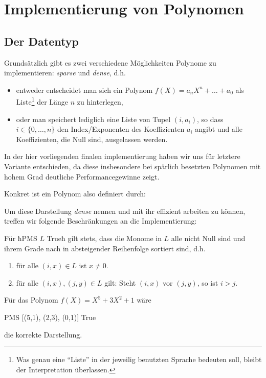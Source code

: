 \section{Implementierung von Polynomen}

\subsection{Der Datentyp}

Grundsätzlich gibt es zwei verschiedene Möglichkeiten Polynome zu
implementieren: \emph{sparse} und \emph{dense}, d.h. 
\begin{itemize}
  \item entweder entscheidet man
    sich ein Polynom $f(X) = a_nX^n + \ldots + a_0$ als Liste\footnote{Was genau 
    eine ``Liste'' in der jeweilig benutzten Sprache bedeuten soll, bleibt der
    Interpretation überlassen.} der Länge $n$ zu hinterlegen,
  \item oder man speichert lediglich eine Liste von Tupel $(i,a_i)$, so dass
    $i \in \{0,\ldots,n\}$ den Index/Exponenten des Koeffizienten $a_i$ angibt
    und alle Koeffizienten, die Null sind, ausgelassen werden.
\end{itemize}
In der hier vorliegenden finalen implementierung haben wir uns für letztere
Variante entschieden, da diese insbesondere bei spärlich besetzten Polynomen
mit hohem Grad deutliche Performancegewinne zeigt.

Konkret ist ein Polynom also definiert durch:

Um diese Darstellung \emph{dense} nennen und mit ihr effizient arbeiten zu 
können, treffen wir folgende Beschränkungen an die Implementierung:
\begin{invariante}
  \label{inv:poly}
  Für ħPMS $L$ Trueħ gilt stets, dass die Monome in $L$ alle nicht Null 
  sind und ihrem Grade nach in
  absteigender Reihenfolge sortiert sind, d.h.
  \begin{enumerate}
    \item für alle $(i,x) \in L$ ist $x \neq 0$.
    \item für alle $(i,x), (j,y) \in L$ gilt: Steht $(i,x)$ vor $(j,y)$, so ist
      $i > j$.
  \end{enumerate}
\end{invariante}

\begin{beispiel}
  Für das Polynom $f(X) = X^5 + 3X^2 + 1$ wäre 
  \begin{hcode}
    PMS [(5,1), (2,3), (0,1)] True
  \end{hcode}
  die korrekte Darstellung.
\end{beispiel}

